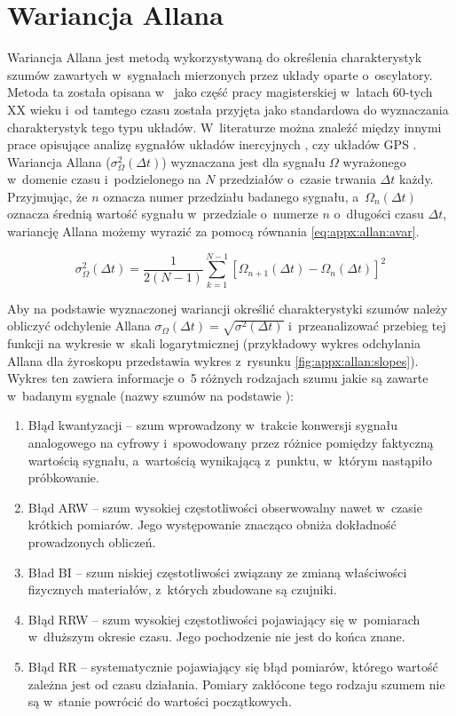 \chapter{Wariancja Allana}\label{chap:appx:allan}
Wariancja Allana jest metodą wykorzystywaną do określenia charakterystyk szumów zawartych w~sygnałach mierzonych przez układy oparte o~oscylatory. Metoda ta została opisana w~\cite{Allan1966} jako część pracy magisterskiej w~latach 60-tych XX wieku i~od tamtego czasu została przyjęta jako standardowa do wyznaczania charakterystyk tego typu układów. W~literaturze można znaleźć między innymi prace opisujące analizę sygnałów układów inercyjnych \cite{El-Sheimy2008, FreescaleSemiconductor2015}, czy układów GPS \cite{Wright2007}. 
Wariancja Allana ($\sigma_{\Omega}^2(\Delta t)$) wyznaczana jest dla sygnału $\Omega$ wyrażonego w~domenie czasu i~podzielonego na $N$ przedziałów o~czasie trwania $\Delta t$ każdy. Przyjmując, że $n$ oznacza numer przedziału badanego sygnału, a~$\Omega_n(\Delta t)$ oznacza średnią wartość sygnału w~przedziale o~numerze $n$ o~długości czasu $\Delta t$, wariancję Allana możemy wyrazić za pomocą równania \ref{eq:appx:allan:avar}\cite{Sochocka2004,Allan1987}.

\begin{equation}
	\label{eq:appx:allan:avar}
	\sigma_{\Omega}^2(\Delta t) = \frac{1}{2(N-1)}\sum_{k=1}^{N-1}[\Omega_{n+1}(\Delta t)-\Omega_n(\Delta t)]^2
\end{equation}

		
Aby na podstawie wyznaczonej wariancji określić charakterystyki szumów należy obliczyć odchylenie Allana $\sigma_{\Omega}(\Delta t) = \sqrt{\sigma^2(\Delta t)}$ i~przeanalizować przebieg tej funkcji na wykresie w~skali logarytmicznej (przykładowy wykres odchylania Allana dla żyroskopu przedstawia wykres z~rysunku \ref{fig:appx:allan:slopes}). Wykres ten zawiera informacje o~5 różnych rodzajach szumu jakie są zawarte w~badanym sygnale (nazwy szumów na podstawie \cite{PASZEK2016}):
		
\begin{enumerate}
	\item {Błąd kwantyzacji -- szum wprowadzony w~trakcie konwersji sygnału analogowego na cyfrowy i~spowodowany przez różnice pomiędzy faktyczną wartością sygnału, a~wartością wynikającą z~punktu, w~którym nastąpiło próbkowanie.}
	\item {Błąd ARW -- szum wysokiej częstotliwości obserwowalny nawet w~czasie krótkich pomiarów. Jego występowanie znacząco obniża dokładność prowadzonych obliczeń.}
	\item {Bład BI -- szum niskiej częstotliwości związany ze zmianą właściwości fizycznych materiałów, z~których zbudowane są czujniki.}
	\item {Błąd RRW -- szum wysokiej częstotliwości pojawiający się w~pomiarach w~dłuższym okresie czasu. Jego pochodzenie nie jest do końca znane.}
	\item {Błąd RR -- systematycznie pojawiający się błąd pomiarów, którego wartość zależna jest od czasu działania. Pomiary zakłócone tego rodzaju szumem nie są w~stanie powrócić do wartości początkowych.}	
\end{enumerate}
		
